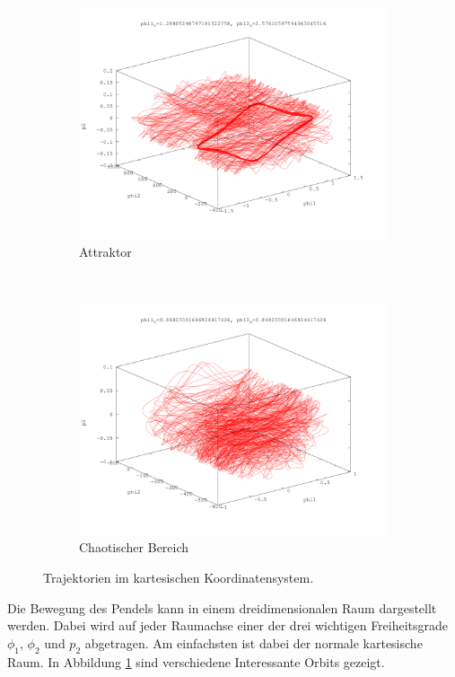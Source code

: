 \begin{figure}
\begin{subfigure}[b]{0.3\textwidth}
                \includegraphics[width=\textwidth]{images/phasenraeume/phi2_is_2_phi1_82.png}
                \caption{Attraktor}
        \end{subfigure}
        ~
        \begin{subfigure}[b]{0.3\textwidth}
                \centering
                \includegraphics[width=\textwidth]{images/phasenraeume/phi1_is_phi2_54.png}
                \caption{Chaotischer Bereich}
        \end{subfigure}
        \caption{Trajektorien im kartesischen Koordinatensystem.}
        \label{fig:trajektorien_kartesisch}
\end{figure}

Die Bewegung des Pendels kann in einem dreidimensionalen Raum dargestellt werden.
Dabei wird auf jeder Raumachse einer der drei wichtigen Freiheitsgrade $\phi_1$, $\phi_2$ und $p_2$ abgetragen.
Am einfachsten ist dabei der normale kartesische Raum.
In Abbildung \ref{fig:trajektorien_kartesisch} sind verschiedene Interessante Orbits gezeigt.


